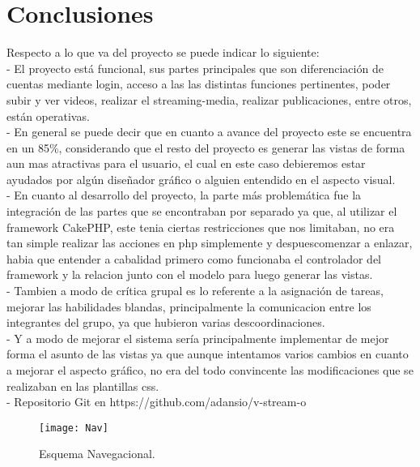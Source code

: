 \documentclass[12pt]{article}
\begin{document}
\newpage
\section{Conclusiones\\}
Respecto a lo que va del proyecto se puede indicar lo siguiente:\\
-	El proyecto está funcional, sus partes principales que son diferenciación de cuentas 
mediante login, acceso a las las distintas funciones pertinentes, poder subir y ver videos, realizar
el streaming-media, realizar publicaciones, entre otros, están operativas.\\

-	En general se puede decir que en cuanto a avance del proyecto este se encuentra en un 85\%, 
considerando que el resto del proyecto es generar las vistas de forma aun mas atractivas para el usuario,
el cual en este caso debieremos estar ayudados por algún dise\~nador gráfico o alguien entendido en el aspecto
visual.\\

-	En cuanto al desarrollo del proyecto, la parte más problemática fue la integración de las partes que
se encontraban por separado ya que, al utilizar el framework CakePHP, este tenia ciertas restricciones 
que nos limitaban, no era tan simple realizar las acciones en php simplemente y despuescomenzar a enlazar,
habia que entender a cabalidad primero como funcionaba el controlador del framework y la relacion junto con el 
modelo para luego generar las vistas.\\

-	Tambien a modo de crítica grupal es lo referente a la asignación de tareas, mejorar las habilidades blandas,
principalmente la comunicacion entre los integrantes del grupo, ya que hubieron varias descoordinaciones.\\

-	Y a modo de mejorar el sistema sería principalmente implementar de mejor forma el asunto de las vistas ya que 
aunque intentamos varios cambios en cuanto a mejorar el aspecto gráfico, no era del todo convincente las 
modificaciones que se realizaban en las plantillas css.\\

-	Repositorio Git en https://github.com/adansio/v-stream-o



\newpage

%
\newpage
\begin{figure}
  \centering
      \texttt{[image: Nav]}
	    \caption{Esquema Navegacional.}
	\label{fig:Nav}
\end{figure}
\end{document}
